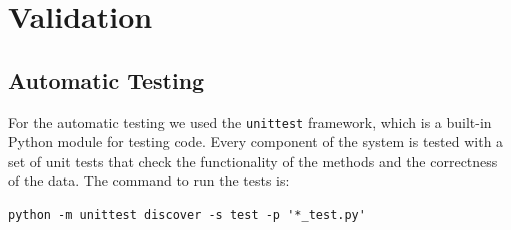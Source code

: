 \documentclass{scrartcl}
\begin{document}
\newpage
\section{Validation}\label{validation}
\subsection{Automatic Testing}\label{automatic-testing}
% 
%
% 
% 
% 

For the automatic testing we used the \texttt{unittest} framework, which is a built-in Python module 
for testing code. Every component of the system is tested with a set of unit tests that check the 
functionality of the methods and the correctness of the data.
The command to run the tests is:
\begin{verbatim}
python -m unittest discover -s test -p '*_test.py'
\end{verbatim}
\end{document}
